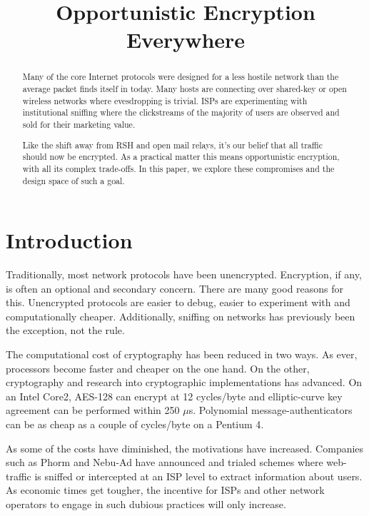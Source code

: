 \documentclass[conference]{IEEEtran}
\begin{document}
\title{Opportunistic Encryption Everywhere}

\author{
}

\maketitle

\begin{abstract}
Many of the core Internet protocols were designed for a less hostile network
than the average packet finds itself in today. Many hosts are connecting over
shared-key or open wireless networks where evesdropping is trivial. ISPs are
experimenting with institutional sniffing where the clickstreams of the
majority of users are observed and sold for their marketing value.

Like the shift away from RSH and open mail relays, it's our belief that all
traffic should now be encrypted. As a practical matter this means
opportunistic encryption, with all its complex trade-offs. In this paper, we
explore these compromises and the design space of such a goal.
\end{abstract}

\section{Introduction}

Traditionally, most network protocols have been unencrypted. Encryption, if
any, is often an optional and secondary concern. There are many good reasons
for this. Unencrypted protocols are easier to debug, easier to experiment with
and computationally cheaper. Additionally, sniffing on networks has previously
been the exception, not the rule.

The computational cost of cryptography has been reduced in two ways.
As ever, processors become faster and cheaper on the one hand. On the other,
cryptography and research into cryptographic implementations has advanced. On
an Intel Core2, AES-128 can encrypt at 12 cycles/byte\cite{aesspeed} and
elliptic-curve key agreement can be performed within 250
$\mu$s\cite{curve25519}. Polynomial message-authenticators can be as cheap as a
couple of cycles/byte on a Pentium 4\cite{umac}.

As some of the costs have diminished, the motivations have increased. Companies
such as Phorm and Nebu-Ad have announced and trialed schemes where web-traffic
is sniffed or intercepted at an ISP level to extract information about users.
As economic times get tougher, the incentive for ISPs and other network
operators to engage in such dubious practices will only increase.
\end{document}
